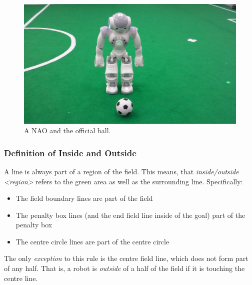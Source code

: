 \begin{figure}[t]
	\centerline{\includegraphics[height=0.28\columnwidth]{figs/robotWithBall2016.jpg}}
	\caption{A NAO and the official ball.}
	\label{fig:ball}
\end{figure}


\subsubsection{Definition of Inside and Outside}
\label{sec:inside_outside}

A line is always part of a region of the field.
This means, that \emph{inside/outside \textless region\textgreater} refers to the green area as well as the surrounding line.
Specifically:
\begin{itemize}
	\item The field boundary lines are part of the field
	\item The penalty box lines (and the end field line inside of the goal) part of the penalty box
	\item The centre circle lines are part of the centre circle
\end{itemize}

The only \textit{exception} to this rule is the centre field line, which does not form part of any half.
That is, a robot is \textit{outside} of a half of the field if it is touching the centre line.

